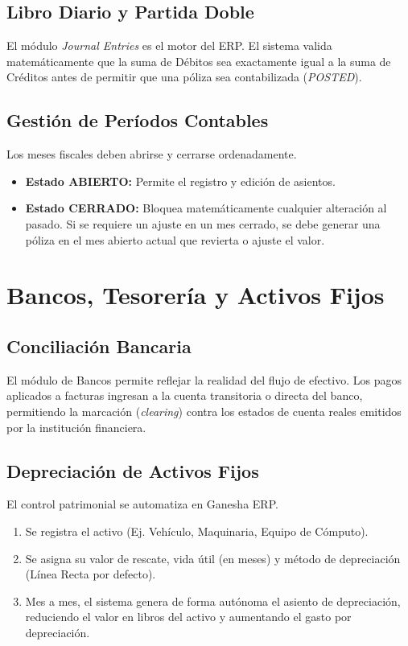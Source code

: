 \documentclass[12pt, a4paper, oneside]{book}
\begin{document}
\section{Libro Diario y Partida Doble}
El módulo \textit{Journal Entries} es el motor del ERP. El sistema valida matemáticamente que la suma de Débitos sea exactamente igual a la suma de Créditos antes de permitir que una póliza sea contabilizada (\textit{POSTED}).

\section{Gestión de Períodos Contables}
Los meses fiscales deben abrirse y cerrarse ordenadamente.
\begin{itemize}
    \item \textbf{Estado ABIERTO:} Permite el registro y edición de asientos.
    \item \textbf{Estado CERRADO:} Bloquea matemáticamente cualquier alteración al pasado. Si se requiere un ajuste en un mes cerrado, se debe generar una póliza en el mes abierto actual que revierta o ajuste el valor.
\end{itemize}

\chapter{Bancos, Tesorería y Activos Fijos}

\section{Conciliación Bancaria}
El módulo de Bancos permite reflejar la realidad del flujo de efectivo. Los pagos aplicados a facturas ingresan a la cuenta transitoria o directa del banco, permitiendo la marcación (\textit{clearing}) contra los estados de cuenta reales emitidos por la institución financiera.

\section{Depreciación de Activos Fijos}
El control patrimonial se automatiza en Ganesha ERP.
\begin{enumerate}
    \item Se registra el activo (Ej. Vehículo, Maquinaria, Equipo de Cómputo).
    \item Se asigna su valor de rescate, vida útil (en meses) y método de depreciación (Línea Recta por defecto).
    \item Mes a mes, el sistema genera de forma autónoma el asiento de depreciación, reduciendo el valor en libros del activo y aumentando el gasto por depreciación.
\end{enumerate}
\end{document}
